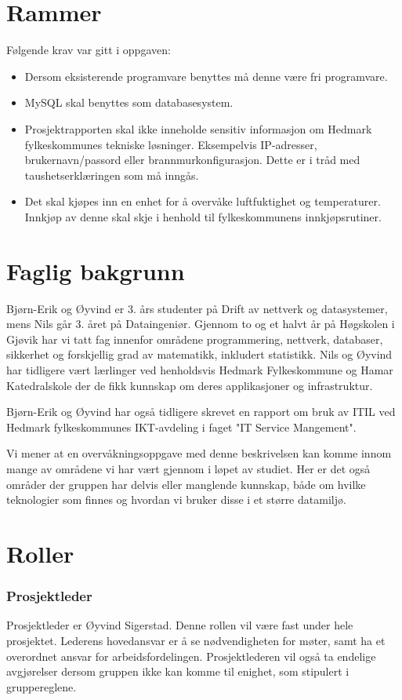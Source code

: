 \section{Rammer}
Følgende krav var gitt i oppgaven:
\begin{itemize}
	\item Dersom eksisterende programvare benyttes må denne være fri programvare.
	\item MySQL skal benyttes som databasesystem.
	\item Prosjektrapporten skal ikke inneholde sensitiv informasjon om Hedmark fylkeskommunes tekniske løsninger. Eksempelvis IP-adresser, brukernavn/passord eller brannmurkonfigurasjon. Dette er i tråd med taushetserklæringen som må inngås.
	\item Det skal kjøpes inn en enhet for å overvåke luftfuktighet og temperaturer. Innkjøp av denne skal skje i henhold til fylkeskommunens innkjøpsrutiner.
\end{itemize}

\section{Faglig bakgrunn}

Bjørn-Erik og Øyvind er 3. års studenter på Drift av nettverk og datasystemer, mens Nils går 3. året på Dataingeniør. Gjennom to og et halvt år på Høgskolen i Gjøvik har vi tatt fag innenfor områdene programmering, nettverk, databaser, sikkerhet og forskjellig grad av matematikk, inkludert statistikk. Nils og Øyvind har tidligere vært lærlinger ved henholdsvis Hedmark Fylkeskommune og Hamar Katedralskole der de fikk kunnskap om deres applikasjoner og infrastruktur.

Bjørn-Erik og Øyvind har også tidligere skrevet en rapport om bruk av ITIL ved Hedmark fylkeskommunes IKT-avdeling i faget "IT Service Mangement".

Vi mener at en overvåkningsoppgave med denne beskrivelsen kan komme innom mange av områdene vi har vært gjennom i løpet av studiet. Her er det også områder der gruppen har delvis eller manglende kunnskap, både om hvilke teknologier som finnes og hvordan vi bruker disse i et større datamiljø.

\section{Roller}
\subsubsection{Prosjektleder}
Prosjektleder er Øyvind Sigerstad. Denne rollen vil være fast under hele prosjektet. Lederens hovedansvar er å se nødvendigheten for møter, samt ha et overordnet ansvar for arbeidsfordelingen. Prosjektlederen vil også ta endelige avgjørelser dersom gruppen ikke kan komme til enighet, som stipulert i gruppereglene.

